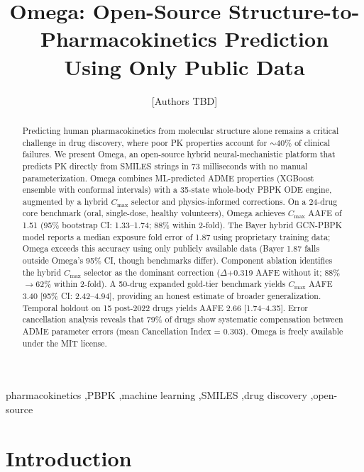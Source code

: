 \documentclass[review,3p]{elsarticle}
\begin{document}
\begin{frontmatter}

\title{Omega: Open-Source Structure-to-Pharmacokinetics Prediction\\Using Only Public Data}

\author{[Authors TBD]}
\address{[Affiliations TBD]}

\begin{abstract}
Predicting human pharmacokinetics from molecular structure alone remains a critical challenge in drug discovery, where poor PK properties account for ${\sim}40\%$ of clinical failures. We present Omega, an open-source hybrid neural-mechanistic platform that predicts PK directly from SMILES strings in 73 milliseconds with no manual parameterization. Omega combines ML-predicted ADME properties (XGBoost ensemble with conformal intervals) with a 35-state whole-body PBPK ODE engine, augmented by a hybrid $C_{\max}$ selector and physics-informed corrections. On a 24-drug core benchmark (oral, single-dose, healthy volunteers), Omega achieves $C_{\max}$ AAFE of 1.51 (95\% bootstrap CI: 1.33--1.74; 88\% within 2-fold). The Bayer hybrid GCN-PBPK model \cite{gruber2024hybrid} reports a median exposure fold error of 1.87 using proprietary training data; Omega exceeds this accuracy using only publicly available data (Bayer 1.87 falls outside Omega's 95\% CI, though benchmarks differ). Component ablation identifies the hybrid $C_{\max}$ selector as the dominant correction ($\Delta$+0.319 AAFE without it; 88\%$\to$62\% within 2-fold). A 50-drug expanded gold-tier benchmark yields $C_{\max}$ AAFE 3.40 [95\% CI: 2.42--4.94], providing an honest estimate of broader generalization. Temporal holdout on 15 post-2022 drugs yields AAFE 2.66 [1.74--4.35]. Error cancellation analysis reveals that 79\% of drugs show systematic compensation between ADME parameter errors (mean Cancellation Index = 0.303). Omega is freely available under the MIT license.
\end{abstract}

\begin{keyword}
pharmacokinetics \sep PBPK \sep machine learning \sep SMILES \sep drug discovery \sep open-source
\end{keyword}

\end{frontmatter}

\linenumbers

\section{Introduction}
\label{sec:introduction}
\end{document}
